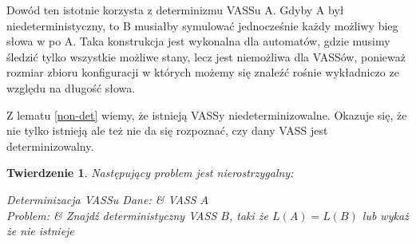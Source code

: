 \documentclass[magisterska]{pracamgr}
\newtheorem{theorem}{Twierdzenie}[section]
\begin{document}
    Dowód ten istotnie korzysta z determinizmu VASSu A.
    Gdyby A był niedeterministyczny, to B musiałby symulować jednocześnie każdy możliwy bieg słowa w po A.
    Taka konstrukcja jest wykonalna dla automatów, gdzie musimy śledzić tylko wszystkie możliwe stany,
    lecz jest niemożliwa dla VASSów, ponieważ rozmiar zbioru konfiguracji w których możemy się znaleźć rośnie wykładniczo ze względu na długość słowa.


    Z lematu \ref{non-det} wiemy, że istnieją VASSy niedeterminizowalne.
    Okazuje się, że nie tylko istnieją ale też nie da się rozpoznać, czy dany VASS jest determinizowalny.

    \begin{theorem}
        \label{det-decidability}
        Następujący problem jest nierostrzygalny:
        \begin{problem}[]{Determinizacja VASSu}
            Dane: & VASS $A$\\
            Problem: & Znajdź deterministyczny VASS $B$, taki że $L(A) = L(B)$ lub wykaż że nie istnieje\\
        \end{problem}


    \end{theorem}
\end{document}
